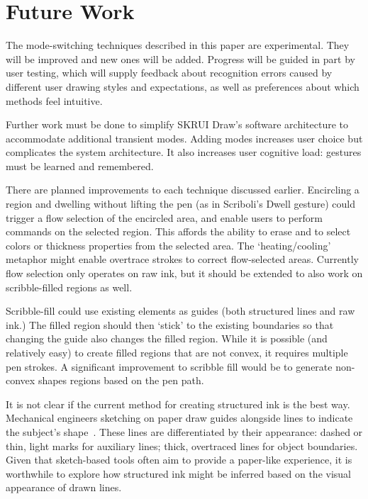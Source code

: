 \documentclass{egpubl}
\begin{document}
\section{Future Work}

The mode-switching techniques described in this paper are
experimental. They will be improved and new ones will be
added. Progress will be guided in part by user testing, which will
supply feedback about recognition errors caused by different user
drawing styles and expectations, as well as preferences about which
methods feel intuitive.

Further work must be done to simplify SKRUI Draw's software
architecture to accommodate additional transient modes. Adding modes
increases user choice but complicates the system architecture. It also
increases user cognitive load: gestures must be learned and
remembered.

There are planned improvements to each technique discussed
earlier. Encircling a region and dwelling without lifting the pen (as
in Scriboli's Dwell gesture) could trigger a flow selection of the
encircled area, and enable users to perform commands on the selected
region. This affords the ability to erase and to select colors or
thickness properties from the selected area. The `heating/cooling'
metaphor might enable overtrace strokes to correct flow-selected
areas. Currently flow selection only operates on raw ink, but it
should be extended to also work on scribble-filled regions as well.

Scribble-fill could use existing elements as guides (both structured
lines and raw ink.) The filled region should then `stick' to the
existing boundaries so that changing the guide also changes the filled
region. While it is possible (and relatively easy) to create filled
regions that are not convex, it requires multiple pen strokes. A
significant improvement to scribble fill would be to generate
non-convex shapes regions based on the pen path.

It is not clear if the current method for creating structured ink is
the best way. Mechanical engineers sketching on paper draw guides
alongside lines to indicate the subject's
shape~\cite{company-modes}. These lines are differentiated by their
appearance: dashed or thin, light marks for auxiliary lines; thick,
overtraced lines for object boundaries. Given that sketch-based tools
often aim to provide a paper-like experience, it is worthwhile to
explore how structured ink might be inferred based on the visual
appearance of drawn lines.
\end{document}
